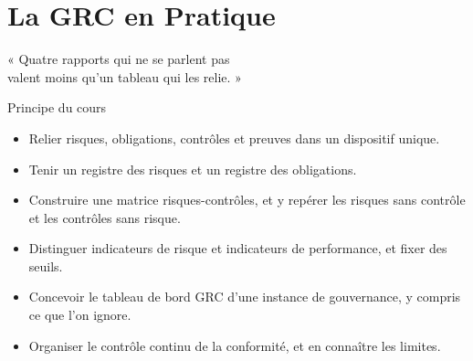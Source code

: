 
\chapter{La GRC en Pratique}
\label{chap:grc-pratique}

\epigraph{%
    « Quatre rapports qui ne se parlent pas\\
    valent moins qu'un tableau qui les relie. »%
}{Principe du cours}


\begin{boxobjectifs}
\begin{itemize}
    \item Relier risques, obligations, contrôles et preuves dans un
          dispositif unique.
    \item Tenir un registre des risques et un registre des obligations.
    \item Construire une matrice risques-contrôles, et y repérer les risques
          sans contrôle et les contrôles sans risque.
    \item Distinguer indicateurs de risque et indicateurs de performance, et
          fixer des seuils.
    \item Concevoir le tableau de bord GRC d'une instance de gouvernance, y
          compris ce que l'on ignore.
    \item Organiser le contrôle continu de la conformité, et en connaître
          les limites.
\end{itemize}
\end{boxobjectifs}

